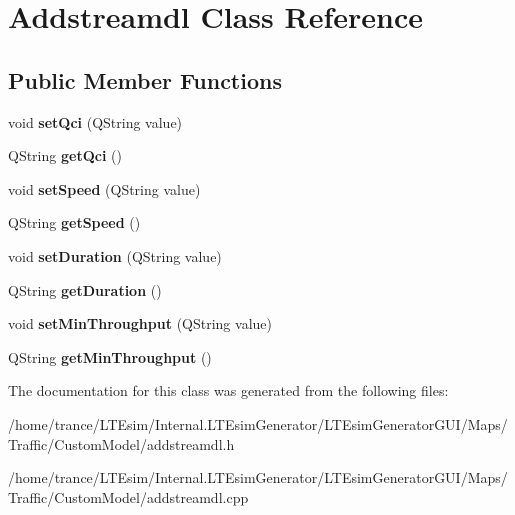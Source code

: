 \hypertarget{class_addstreamdl}{}\section{Addstreamdl Class Reference}
\label{class_addstreamdl}
\subsection*{Public Member Functions}
\begin{DoxyCompactItemize}
\item 
void {\bfseries set\+Qci} (Q\+String value)\hypertarget{class_addstreamdl_a10cdf6f0f575416427bd7023486bad97}{}\label{class_addstreamdl_a10cdf6f0f575416427bd7023486bad97}

\item 
Q\+String {\bfseries get\+Qci} ()\hypertarget{class_addstreamdl_a450587cbc6e5b655650bda27f9f51f68}{}\label{class_addstreamdl_a450587cbc6e5b655650bda27f9f51f68}

\item 
void {\bfseries set\+Speed} (Q\+String value)\hypertarget{class_addstreamdl_a4cf962054bc8f27ac28cbc8717d67c7c}{}\label{class_addstreamdl_a4cf962054bc8f27ac28cbc8717d67c7c}

\item 
Q\+String {\bfseries get\+Speed} ()\hypertarget{class_addstreamdl_a423eb7a4df392bd7dc253eeaa142f2fa}{}\label{class_addstreamdl_a423eb7a4df392bd7dc253eeaa142f2fa}

\item 
void {\bfseries set\+Duration} (Q\+String value)\hypertarget{class_addstreamdl_a07b27450cd06753bcf7f1922f3cbef50}{}\label{class_addstreamdl_a07b27450cd06753bcf7f1922f3cbef50}

\item 
Q\+String {\bfseries get\+Duration} ()\hypertarget{class_addstreamdl_a2b6ebb517d93e6372e9467bf8a649c64}{}\label{class_addstreamdl_a2b6ebb517d93e6372e9467bf8a649c64}

\item 
void {\bfseries set\+Min\+Throughput} (Q\+String value)\hypertarget{class_addstreamdl_a245b85e397bf4f9e05f4c018d836af44}{}\label{class_addstreamdl_a245b85e397bf4f9e05f4c018d836af44}

\item 
Q\+String {\bfseries get\+Min\+Throughput} ()\hypertarget{class_addstreamdl_a71bf1e866cc6ead01ebafb90a4f37f54}{}\label{class_addstreamdl_a71bf1e866cc6ead01ebafb90a4f37f54}

\end{DoxyCompactItemize}


The documentation for this class was generated from the following files\+:\begin{DoxyCompactItemize}
\item 
/home/trance/\+L\+T\+Esim/\+Internal.\+L\+T\+Esim\+Generator/\+L\+T\+Esim\+Generator\+G\+U\+I/\+Maps/\+Traffic/\+Custom\+Model/addstreamdl.\+h\item 
/home/trance/\+L\+T\+Esim/\+Internal.\+L\+T\+Esim\+Generator/\+L\+T\+Esim\+Generator\+G\+U\+I/\+Maps/\+Traffic/\+Custom\+Model/addstreamdl.\+cpp\end{DoxyCompactItemize}
